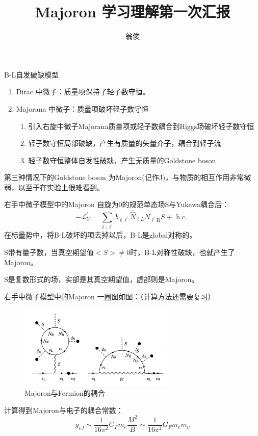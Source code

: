 \documentclass[11pt]{beamer}
\author{翁俊}
\title{Majoron 学习理解第一次汇报}
\date{}
\begin{document}
\begin{frame}
\titlepage
\end{frame}


\begin{frame}{B-L自发破缺模型}
\begin{enumerate}
\item {Dirac 中微子：质量项保持了轻子数守恒。}
\item {Majorana 中微子：质量项破坏轻子数守恒
\begin{enumerate}
\item {引入右旋中微子Majorana质量项或轻子数耦合到Higgs场破坏轻子数守恒}
\item {轻子数守恒局部破缺，产生有质量的矢量介子，耦合到轻子流}
\item {轻子数守恒整体自发性破缺，产生无质量的Goldstone  boson}
\end{enumerate}
}
\end{enumerate}
第三种情况下的Goldstone boson 为Majoron(记作J)，与物质的相互作用非常微弱，以至于在实验上很难看到。
\end{frame}

\begin{frame}{右手中微子模型中的Majoron}
自旋为0的规范单态场S与Yukawa耦合后：
$$
-\mathscr{L}_{Y}^{\prime}=\sum_{\ell, \ell^{\prime}} b_{\ell \ell^{\prime}} \overline{\widehat{N}}_{\ell L} N_{\ell^{\prime} \mathrm{R}} S+\text { h.c. }
$$
在标量势中，将B-L破坏的项去掉以后，B-L是global对称的。

S带有量子数，当真空期望值$<S>\neq 0$时，B-L对称性破缺，也就产生了Majoron。

S是复数形式的场，实部是其真空期望值，虚部则是Majoron。



\end{frame}

\begin{frame}{右手中微子模型中的Majoron}
一圈图如图：（计算方法还需要复习）
\begin{figure}[H]
 \centering
 \includegraphics[height=4cm]{pic/1.png}
 \caption{Majoron与Fermion的耦合}
 \label{fig:1}
\end{figure}
计算得到Majoron与电子的耦合常数：
$$
g_{e J} \sim \frac{1}{16 \pi^{2}} G_{F} m_{e} \frac{M^{2}}{B} \sim \frac{1}{16 \pi^{2}} G_{F} m_{e} m_{\nu}
$$

\end{frame}
\end{document}
